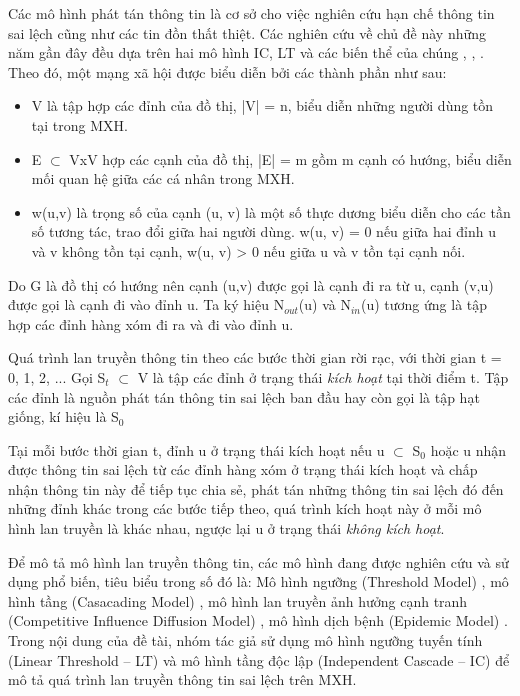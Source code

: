 Các mô hình phát tán thông tin là cơ sở cho việc nghiên cứu hạn chế thông tin sai lệch cũng như các tin đồn thất thiệt. Các nghiên cứu về chủ đề này những năm gần đây đều dựa trên hai mô hình IC, LT và các biến thể của chúng \cite{kemple2}, \cite{Golden}, \cite{Carnes}. Theo đó, một mạng xã hội được biểu diễn bởi các thành phần như sau:
\begin {itemize}
	\item V là tập hợp các đỉnh của đồ thị, |V| = n, biểu diễn những người dùng tồn tại trong MXH.

	\item E $\subset$ VxV hợp các cạnh của đồ thị, |E| = m gồm m cạnh có hướng, biểu diễn mối quan hệ giữa các cá nhân trong MXH.

	\item w(u,v) là trọng số của cạnh (u, v) là một số thực dương biểu diễn cho các tần số tương tác, trao đổi giữa hai người dùng. w(u, v) = 0 nếu giữa hai đỉnh u và v không tồn tại cạnh, w(u, v) > 0 nếu giữa u và v tồn tại cạnh nối.
\end {itemize}
Do G là đồ thị có hướng nên cạnh (u,v) được gọi là cạnh đi ra từ u, cạnh (v,u) được gọi là cạnh đi vào đỉnh u. Ta ký hiệu N$_{out}$(u) và N$_{in}$(u) tương ứng là tập hợp các đỉnh hàng xóm đi ra và đi vào đỉnh u.

Quá trình lan truyền thông tin theo các bước thời gian rời rạc, với thời gian t = 0, 1, 2, ... Gọi S$_{t}$ $\subset$ V là tập các đỉnh ở trạng thái {\itshape kích hoạt} tại thời điểm t. Tập các đỉnh là nguồn phát tán thông tin sai lệch ban đầu hay còn gọi là tập hạt giống, kí hiệu là S$_{0}$

Tại mỗi bước thời gian t, đỉnh u ở trạng thái kích hoạt nếu u $\subset$ S$_{0}$ hoặc u nhận được thông tin sai lệch từ các đỉnh hàng xóm ở trạng thái kích hoạt và chấp nhận thông tin này để tiếp tục chia sẻ, phát tán những thông tin sai lệch đó đến những đỉnh khác trong các bước tiếp theo, quá trình kích hoạt này ở mỗi mô hình lan truyền là khác nhau, ngược lại u ở trạng thái {\itshape không kích hoạt}.

Để mô tả mô hình lan truyền thông tin, các mô hình đang được nghiên cứu và sử dụng phổ biến, tiêu biểu trong số đó là: Mô hình ngưỡng (Threshold Model) \cite{kemple2}, mô hình tầng (Casacading Model) \cite{Golden}, mô hình lan truyền ảnh hưởng cạnh tranh (Competitive Influence Diffusion Model) \cite{Carnes}, mô hình dịch bệnh (Epidemic Model) \cite{leskovec}. Trong nội dung của đề tài, nhóm tác giả sử dụng mô hình ngưỡng tuyến tính (Linear Threshold – LT) và mô hình tầng độc lập (Independent Cascade – IC) \cite{kemple1} để mô tả quá trình lan truyền thông tin sai lệch trên MXH.

